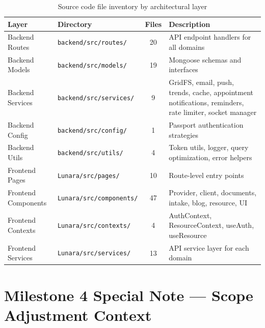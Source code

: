 \documentclass[12pt,letterpaper]{article}
\begin{document}
\begin{table}[H]
\centering
\small
\begin{tabularx}{\textwidth}{|l|l|c|>{\raggedright\arraybackslash}X|}
\hline
\rowcolor{TableHeader}\textcolor{TableHeaderText}{\textbf{Layer}} & \textcolor{TableHeaderText}{\textbf{Directory}} & \textcolor{TableHeaderText}{\textbf{Files}} & \textcolor{TableHeaderText}{\textbf{Description}} \\
\hline
Backend Routes & \texttt{backend/src/routes/} & 20 & API endpoint handlers for all domains \\
\hline
\rowcolor{TableRowAlt}
Backend Models & \texttt{backend/src/models/} & 19 & Mongoose schemas and interfaces \\
\hline
Backend Services & \texttt{backend/src/services/} & 9 & GridFS, email, push, trends, cache, appointment notifications, reminders, rate limiter, socket manager \\
\hline
\rowcolor{TableRowAlt}
Backend Config & \texttt{backend/src/config/} & 1 & Passport authentication strategies \\
\hline
Backend Utils & \texttt{backend/src/utils/} & 4 & Token utils, logger, query optimization, error helpers \\
\hline
\rowcolor{TableRowAlt}
Frontend Pages & \texttt{Lunara/src/pages/} & 10 & Route-level entry points \\
\hline
Frontend Components & \texttt{Lunara/src/components/} & 47 & Provider, client, documents, intake, blog, resource, UI \\
\hline
\rowcolor{TableRowAlt}
Frontend Contexts & \texttt{Lunara/src/contexts/} & 4 & AuthContext, ResourceContext, useAuth, useResource \\
\hline
Frontend Services & \texttt{Lunara/src/services/} & 13 & API service layer for each domain \\
\hline
\end{tabularx}
\caption{Source code file inventory by architectural layer}
\end{table}

\newpage

\section{Milestone 4 Special Note --- Scope Adjustment Context}
\end{document}
